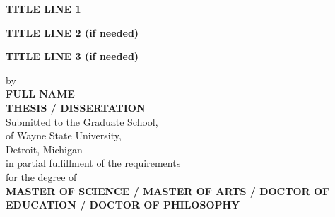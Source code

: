 \centerline{\bf TITLE LINE 1}
\vspace{-0.4cm}
\centerline{\bf TITLE LINE 2 (if needed)}
\vspace{-0.4cm}
\centerline{\bf TITLE LINE 3 (if needed)}

\vskip-0.4cm
\thispagestyle{empty}

\begin{center}
    \vspace{-0.4cm}
    by \\
    {\bf FULL NAME}\\ %
    {\bf THESIS / DISSERTATION}\\  %
    Submitted to the Graduate School,\\
    of Wayne State University,\\
    Detroit, Michigan\\
    in partial fulfillment of the requirements\\
    for the degree of\\
    {\bf MASTER OF SCIENCE / MASTER OF ARTS / DOCTOR OF EDUCATION / DOCTOR OF PHILOSOPHY} %
\end{center}

